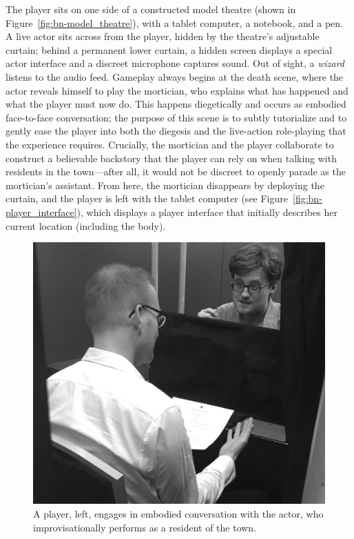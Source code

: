 \documentclass[letterpaper]{article}
\begin{document}
The player sits on one side of a constructed model theatre (shown in Figure~\ref{fig:bn-model_theatre}), with a tablet computer, a notebook, and a pen. A live actor sits across from the player, hidden by the theatre's adjustable curtain; behind a permanent lower curtain, a hidden screen displays a special actor interface and a discreet microphone captures sound. Out of sight, a \textit{wizard} listens to the audio feed. Gameplay always begins at the death scene, where the actor reveals himself to play the mortician, who explains what has happened and what the player must now do. This happens diegetically and occurs as embodied face-to-face conversation; the purpose of this scene is to subtly tutorialize and to gently ease the player into both the diegesis and the live-action role-playing that the experience requires. Crucially, the mortician and the player collaborate to construct a believable backstory that the player can rely on when talking with residents in the town---after all, it would not be discreet to openly parade as the mortician's assistant. From here, the mortician disappears by deploying the curtain, and the player is left with the tablet computer (see Figure~\ref{fig:bn-player_interface}), which displays a player interface that initially describes her current location (including the body).

\begin{figure}[t]
  \centering
  \includegraphics[width=0.8\columnwidth]{images/bad_news-player_and_actor}
  \caption{A player, left, engages in embodied conversation with the actor, who improvisationally performs as a resident of the town.}
  \label{fig:bn-player_and_actor}
\end{figure}
\end{document}
